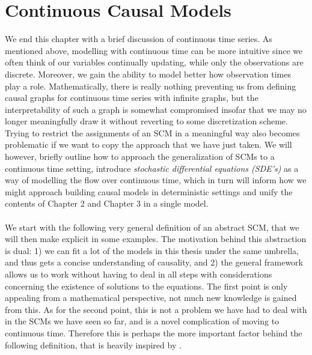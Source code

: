 \documentclass[11pt, a4paper]{memoir}
\theoremstyle{break}
\theoremstyle{break}
\theoremstyle{nonumberplain}
\begin{document}
\section{Continuous Causal Models}\label{contCaus}
We end this chapter with a brief discussion of continuous time series. As mentioned above, modelling with continuous time can be more intuitive since we often think of our variables continually updating, while only the observations are discrete. Moreover, we gain the ability to model better how observation times play a role. Mathematically, there is really nothing preventing us from defining causal graphs for continuous time series with infinite graphs, but the interpretability of such a graph is somewhat compromised insofar that we may no longer meaningfully draw it without reverting to some discretization scheme. Trying to restrict the assignments of an SCM in a meaningful way also becomes problematic if we want to copy the approach that we have just taken. We will however, briefly outline how to approach the generalization of SCMs to a continuous time setting, introduce \emph{stochastic differential equations (SDE's)} as a way of modelling the flow over continuous time, which in turn will inform how we might approach building causal models in deterministic settings and unify the contents of Chapter 2 and Chapter 3 in a single model.\\\\
We start with the following very general definition of an abstract SCM, that we will then make explicit in some examples. The motivation behind this abstraction is dual: 1) we can fit a lot of the models in this thesis under the same umbrella, and thus gets a concise understanding of causality, and 2) the general framework allows us to work without having to deal in all steps with considerations concerning the existence of solutions to the equations. The first point is only appealing from a mathematical perspective, not much new knowledge is gained from this. As for the second point, this is not a problem we have had to deal with in the SCMs we have seen so far, and is a novel complication of moving to continuous time. Therefore this is perhaps the more important factor behind the following definition, that is heavily inspired by \cite{SCMGen}.
\end{document}
